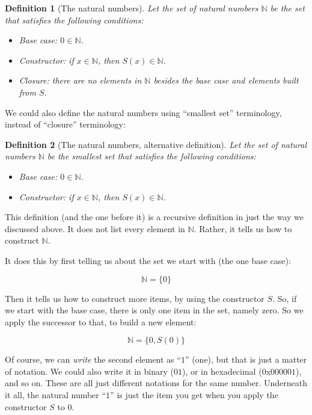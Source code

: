 \documentclass{book}
\numberwithin{equation}{chapter}
\newtheorem{definition}{Definition}
\begin{document}
\begin{definition}[The natural numbers]
Let the set of natural numbers $\mathbb{N}$ be the set that satisfies the following conditions:

\begin{itemize}
\item{Base case: $0 \in \mathbb{N}$.}
\item{Constructor: if $x \in \mathbb{N}$, then $S(x) \in \mathbb{N}$.}
\item{Closure: there are no elements in $\mathbb{N}$ besides the base case and elements built from $S$.}
\end{itemize}
\end{definition}

\noindent
We could also define the natural numbers using ``smallest set'' terminology, instead of ``closure'' terminology:

\begin{definition}[The natural numbers, alternative definition]
Let the set of natural numbers $\mathbb{N}$ be the smallest set that satisfies the following conditions:

\begin{itemize}
\item{Base case: $0 \in \mathbb{N}$.}
\item{Constructor: if $x \in \mathbb{N}$, then $S(x) \in \mathbb{N}$.}
\end{itemize}
\end{definition}

\noindent
This definition (and the one before it) is a recursive definition in just the way we discussed above. It does not list every element in $\mathbb{N}$. Rather, it tells us how to construct $\mathbb{N}$. 

It does this by first telling us about the set we start with (the one base case):

\begin{equation*}
\mathbb{N} = \{ 0 \}
\end{equation*}

\noindent
Then it tells us how to construct more items, by using the constructor $S$. So, if we start with the base case, there is only one item in the set, namely zero. So we apply the successor to that, to build a new element:

\begin{equation*}
\mathbb{N} = \{ 0, S(0) \}
\end{equation*}

\noindent
Of course, we can \textit{write} the second element as ``$1$'' (one), but that is just a matter of notation. We could also write it in binary ($01$), or in hexadecimal ($0$x$000001$), and so on. These are all just different notations for the same number. Underneath it all, the natural number ``$1$'' is just the item you get when you apply the constructor $S$ to $0$.
\end{document}
